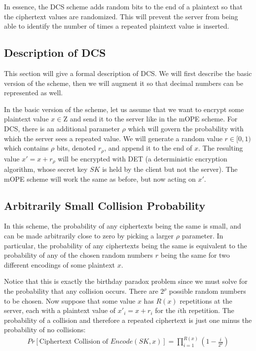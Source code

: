 \documentclass[12pt]{article}
\begin{document}
In essence, the DCS scheme adds random bits to the end of a plaintext so that the ciphertext values are randomized. This will prevent the server from being able to identify the number of times a repeated plaintext value is inserted.

\subsection{Description of DCS}

This section will give a formal description of DCS. We will first describe the basic version of the scheme, then we will augment it so that decimal numbers can be represented as well.

In the basic version of the scheme, let us assume that we want to encrypt some plaintext value $x \in \mathrm{Z}$ and send it to the server like in the mOPE scheme. For DCS, there is an additional parameter $\rho$ which will govern the probability with which the server sees a repeated value. We will generate a random value $r \in [0,1)$ which contains $\rho$ bits, denoted $r_{\rho}$, and append it to the end of $x$. The resulting value $x' = x + r_{\rho}$ will be encrypted with DET (a deterministic encryption algorithm, whose secret key $SK$ is held by the client but not the server). The mOPE scheme will work the same as before, but now acting on $x'$.

\subsection{Arbitrarily Small Collision Probability}

In this scheme, the probability of any ciphertexts being the same is small, and can be made arbitrarily close to zero by picking a larger $\rho$ parameter. In particular, the probability of any ciphertexts being the same is equivalent to the probability of any of the chosen random numbers $r$ being the same for two different encodings of some plaintext $x$.

Notice that this is exactly the birthday paradox problem since we must solve for the probability that any collision occurs. There are $2^\rho$ possible random numbers to be chosen. Now suppose that some value $x$ has $R(x)$ repetitions at the server, each with a plaintext value of $x'_i = x + r_i$ for the $i$th repetition. The probability of a collision and therefore a repeated ciphertext is just one minus the probability of no collisions:
\begin{eqnarray}
  Pr[\textrm{Ciphertext Collision of } Encode(SK, x)] = \prod_{i=1}^{R(x)} \left(1 - \frac{i}{2^{\rho}} \right)
\end{eqnarray}
\end{document}
